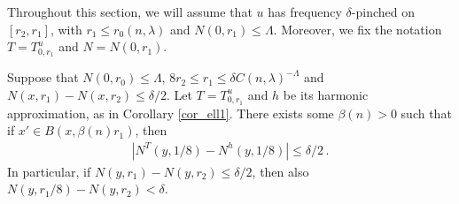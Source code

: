 \documentclass[11pt]{article}
\begin{document}
Throughout this section, we will assume that $u$ has frequency $\delta$-pinched on $[r_2,r_1]$, with $r_1\leq r_0(n,\lambda)$ and $N(0,r_1)\leq \Lambda$. Moreover, we fix the notation $T=T^u_{0,r_1}$ and $N=N(0,r_1)$.

\begin{proposition}\label{prop_ell_y_pinch}
 Suppose that $N(0,r_0)\leq \Lambda$, $8r_2\leq r_1\leq \delta C(n,\lambda)^{-\Lambda}$ and $N(x,r_1)-N(x,r_2)\leq \delta/2$. Let $T=T^u_{0,r_1}$ and $h$ be its harmonic approximation, as in Corollary \ref{cor_ell1}. There exists some $\beta(n)>0$ such that if $x'\in B(x,\beta(n)r_1)$, then
 \begin{gather}
  {\left|{{N^T(y,1/8) } - {N^h(y,1/8)} }\right|}\leq \delta/2\, .
 \end{gather}
 In particular, if $N(y,r_1)-N(y,r_2)\leq \delta/2$, then also $N(y,r_1/8)- N(y,r_2)<\delta$.
\end{proposition}
\end{document}

